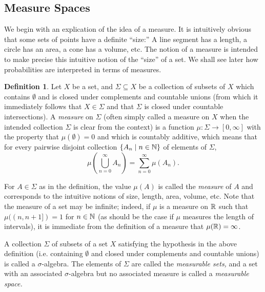\documentclass{article}
\theoremstyle{definition}
\newtheorem{definition}[theorem]{Definition}
\newcommand{\bldset}[2]{\{{#1}\mid{#2}\}}
\begin{document}
\subsection{Measure Spaces}

We begin with an explication of the idea of a measure. It is intuitively obvious that some sets of points have a definite ``size:'' A line segment has a length, a circle has an area, a cone has a volume, etc. The notion of a measure is intended to make precise this intuitive notion of the ``size'' of a set. We shall see later how probabilities are interpreted in terms of measures.

\begin{definition}
Let $X$ be a set, and $\Sigma \subseteq X$ be a collection of subsets of $X$ which contains $\emptyset$ and is closed under complements and countable unions (from which it immediately follows that $X \in \Sigma$ and that $\Sigma$ is closed under countable intersections). A {\em measure} on $\Sigma$ (often simply called a measure on $X$ when the intended collection $\Sigma$ is clear from the context) is a function $\mu\colon \Sigma \rightarrow [0, \infty]$ with the property that $\mu(\emptyset) = 0$ and which is countably additive, which means that for every pairwise disjoint collection $\bldset{A_n}{n \in \N}$ of elements of $\Sigma$,
\[ \mu\left(\bigcup_{n = 0}^\infty A_n\right) = \sum_{n=0}^\infty \mu(A_n). \]
\end{definition}

For $A \in \Sigma$ as in the definition, the value $\mu(A)$ is called the {\em measure} of $A$ and corresponds to the intuitive notions of size, length, area, volume, etc. Note that the measure of a set may be infinite; indeed, if $\mu$ is a measure on $\mathbb{R}$ such that $\mu((n, n+1]) = 1$ for $n \in \mathbb{N}$ (as should be the case if $\mu$ measures the length of intervals), it is immediate from the definition of a measure that $\mu(\mathbb{R}) = \infty$.

A collection $\Sigma$ of subsets of a set $X$ satisfying the hypothesis in the above definition (i.e. containing $\emptyset$ and closed under complements and countable unions) is called a $\sigma$-algebra. The elements of $\Sigma$ are called the {\em measurable sets,} and a set with an associated $\sigma$-algebra but no associated measure is called a {\em measurable space.} 
\end{document}
